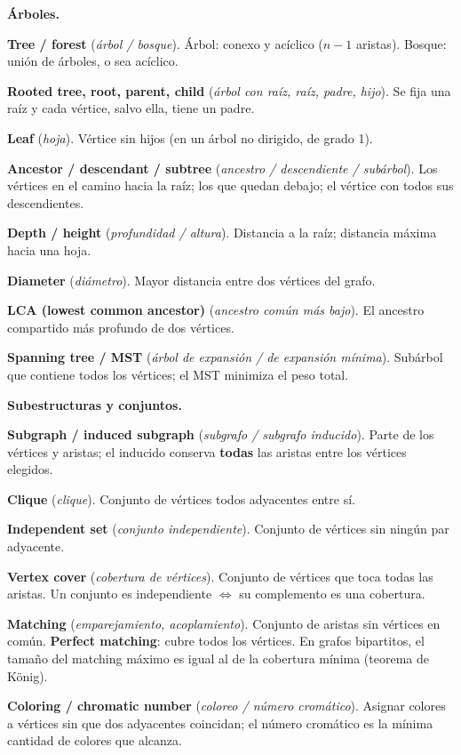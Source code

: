 \textbf{Árboles.}
\begin{props}
  \item \textbf{Tree / forest} (\textit{árbol / bosque}). Árbol: conexo y acíclico (\(n-1\) aristas). Bosque: unión de árboles, o sea acíclico.
  \item \textbf{Rooted tree, root, parent, child} (\textit{árbol con raíz, raíz, padre, hijo}). Se fija una raíz y cada vértice, salvo ella, tiene un padre.
  \item \textbf{Leaf} (\textit{hoja}). Vértice sin hijos (en un árbol no dirigido, de grado 1).
  \item \textbf{Ancestor / descendant / subtree} (\textit{ancestro / descendiente / subárbol}). Los vértices en el camino hacia la raíz; los que quedan debajo; el vértice con todos sus descendientes.
  \item \textbf{Depth / height} (\textit{profundidad / altura}). Distancia a la raíz; distancia máxima hacia una hoja.
  \item \textbf{Diameter} (\textit{diámetro}). Mayor distancia entre dos vértices del grafo.
  \item \textbf{LCA (lowest common ancestor)} (\textit{ancestro común más bajo}). El ancestro compartido más profundo de dos vértices.
  \item \textbf{Spanning tree / MST} (\textit{árbol de expansión / de expansión mínima}). Subárbol que contiene todos los vértices; el MST minimiza el peso total.
\end{props}

\textbf{Subestructuras y conjuntos.}
\begin{props}
  \item \textbf{Subgraph / induced subgraph} (\textit{subgrafo / subgrafo inducido}). Parte de los vértices y aristas; el inducido conserva \textbf{todas} las aristas entre los vértices elegidos.
  \item \textbf{Clique} (\textit{clique}). Conjunto de vértices todos adyacentes entre sí.
  \item \textbf{Independent set} (\textit{conjunto independiente}). Conjunto de vértices sin ningún par adyacente.
  \item \textbf{Vertex cover} (\textit{cobertura de vértices}). Conjunto de vértices que toca todas las aristas. Un conjunto es independiente \(\iff\) su complemento es una cobertura.
  \item \textbf{Matching} (\textit{emparejamiento, acoplamiento}). Conjunto de aristas sin vértices en común. \textbf{Perfect matching}: cubre todos los vértices. En grafos bipartitos, el tamaño del matching máximo es igual al de la cobertura mínima (teorema de König).
  \item \textbf{Coloring / chromatic number} (\textit{coloreo / número cromático}). Asignar colores a vértices sin que dos adyacentes coincidan; el número cromático es la mínima cantidad de colores que alcanza.
\end{props}

